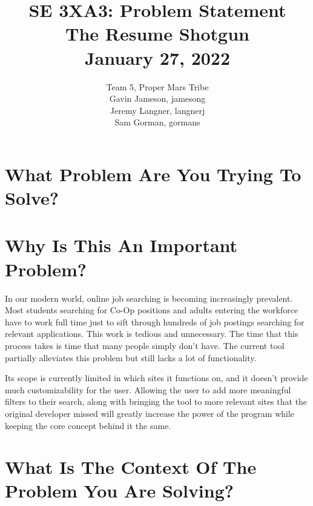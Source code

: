 \documentclass{article}
\title{SE 3XA3: Problem Statement\\The Resume Shotgun\\January 27, 2022}
\author{Team 5, Proper Mars Tribe
		\\ Gavin Jameson, jamesong
		\\ Jeremy Langner, langnerj
		\\ Sam Gorman, gormans
}
\date{}
\begin{document}
\newpage

\maketitle

\section*{What Problem Are You Trying To Solve?}
\section*{Why Is This An Important Problem?}
In our modern world, online job searching is becoming increasingly prevalent. 
Most students searching for Co-Op positions and adults entering the workforce have to work full time 
just to sift through hundreds of job postings searching for relevant applications. This work is tedious 
and unnecessary. The time that this process takes is time that many people simply don’t have.
The current tool partially alleviates this problem but still lacks a lot of functionality. 

Its scope is currently limited in which sites it functions on, and it doesn’t provide much 
customizability for the user. Allowing the user to add more meaningful filters to their search, 
along with bringing the tool to more relevant sites that the original developer missed will 
greatly increase the power of the program while keeping the core concept behind it the same.

\section*{What Is The Context Of The Problem You Are Solving?}

\iffalse
\wss{comment}

\ds{comment}

\mj{comment}

\cm{comment}

\mh{comment}
\fi
\end{document}
